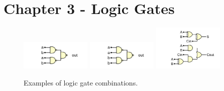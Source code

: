 \documentclass[10pt]{article}
\begin{document}
\section{Chapter 3 - Logic Gates}
\begin{figure}[ht]
\centering
\includegraphics[width=0.3\textwidth]{gateExample1.pdf}
\includegraphics[width=0.3\textwidth]{gateExample2.pdf}
\includegraphics[width=0.3\textwidth]{gateExample3.pdf}
\caption{\label{fig:gates1} Examples of logic gate combinations.}
\end{figure}
\end{document}
